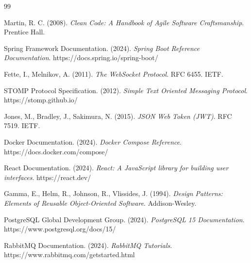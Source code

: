 ﻿\documentclass[a4paper,twoside,11pt]{mwrep}
\theoremstyle{plain} \newtheorem{thm}{Twierdzenie}
\theoremstyle{plain} \newtheorem{lem}{Lemat}
\theoremstyle{definition} \newtheorem{defn}{Definicja}
\theoremstyle{remark} \newtheorem*{rem}{Wniosek}
\begin{document}
\begin{thebibliography}{99}

Martin, R. C. (2008). \textit{Clean Code: A Handbook of Agile Software Craftsmanship}. Prentice Hall.

Spring Framework Documentation. (2024). \textit{Spring Boot Reference Documentation}. https://docs.spring.io/spring-boot/

Fette, I., Melnikov, A. (2011). \textit{The WebSocket Protocol}. RFC 6455. IETF.

STOMP Protocol Specification. (2012). \textit{Simple Text Oriented Messaging Protocol}. https://stomp.github.io/

Jones, M., Bradley, J., Sakimura, N. (2015). \textit{JSON Web Token (JWT)}. RFC 7519. IETF.

Docker Documentation. (2024). \textit{Docker Compose Reference}. https://docs.docker.com/compose/

React Documentation. (2024). \textit{React: A JavaScript library for building user interfaces}. https://react.dev/

Gamma, E., Helm, R., Johnson, R., Vlissides, J. (1994). \textit{Design Patterns: Elements of Reusable Object-Oriented Software}. Addison-Wesley.

PostgreSQL Global Development Group. (2024). \textit{PostgreSQL 15 Documentation}. https://www.postgresql.org/docs/15/

RabbitMQ Documentation. (2024). \textit{RabbitMQ Tutorials}. https://www.rabbitmq.com/getstarted.html

\end{thebibliography}
\end{document}
